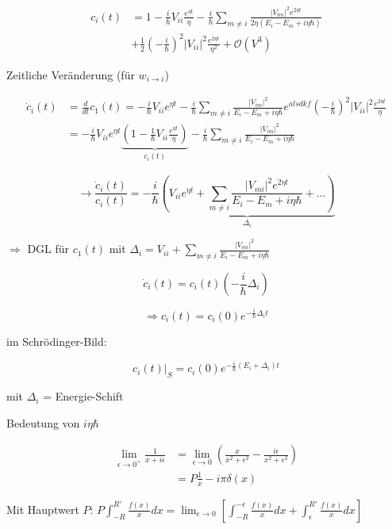 \begin{align}
  c_i(t) &= 1-\frac{i}{\hbar} V_{ii}\frac{e^{\eta t}}{\eta} - \frac{i}{\hbar}\sum_{m\neq i}\frac{|V_{im}|^2e^{2\eta t}}{2\eta(E_i-E_m+i\eta\hbar)}\\
  &+\frac{1}{2}\left(-\frac{i}{\hbar}\right)^2|V_{ii}|^2 \frac{e^{2\eta t}}{\eta^2}+\mathcal O(V^3)
\end{align}



Zeitliche Veränderung (für \(w_{i\rightarrow i}\))

\begin{align}
  \dot c_i(t) &= \frac{d}{dt} c_1(t) = -\frac{i}{\hbar}V_{ii} e^{\eta t}-\frac{i}{\hbar}\sum_{m\neq i}\frac{|V_{im}|^2}{E_i-E_m+i\eta\hbar}e^{alsdkf}\left(-\frac{i}{\hbar}\right)^2|V_{ii}|^2\frac{e^{2\eta t}}{\eta}\\
  &= -\frac{i}{\hbar}V_{ii}e^{\eta t}\underbrace{\left(1-\frac{1}{\hbar}V_{ii}\frac{e^{\eta t}}{\eta} \right)}_{c_i(t)}-\frac{i}{\hbar} \sum_{m\neq i}\frac{|V_{im}|^2}{E_i-E_m+i\eta\hbar}
\end{align}


\[\rightarrow \frac{\dot c_i(t)}{c_i(t)} = -\frac{i}{\hbar}\underbrace{(V_{ii}e^{\eta t}+\sum_{m\neq i}\frac{|V_{mi}|^2e^{2\eta t}}{E_i-E_m+i\eta \hbar}+...)}_{\Delta_i}\]

\(\Rightarrow \) DGL für \(c_1(t)\) mit \(\Delta_i = V_{ii}+\sum_{m\neq i}\frac{|V_{mi}|^2}{E_i-E_m+i\eta \hbar}\)

\[ \dot c_i(t) = c_i(t)(-\frac{i}{\hbar}\Delta_i) \]

\[\boxed{\Rightarrow c_i(t) = c_i(0)e^{-\frac{i}{\hbar}\Delta_i t}}\]

im Schrödinger-Bild:

\[\left.c_i(t)\right|_S=c_i(0)e^{-\frac{i}{\hbar}(E_i+\Delta_i)t}\]

mit \(\Delta_i\) = Energie-Schift

Bedeutung von \(i\eta\hbar\)

\begin{align}
\lim_{\epsilon \to 0^+}\frac{1}{x+i\epsilon} &=\lim_{\epsilon \to 0}\left( \frac{x}{x^2+\epsilon^2}-\frac{i\epsilon}{x^2+\epsilon^2}\right)\\
&= P\frac{1}{x}-i\pi \delta(x)
\end{align}

Mit Hauptwert \(P\):  \(P\int_{-R}^{R'}\frac{f(x)}{x}dx= \lim_{\epsilon \to 0}[\int_{-R}^{-\epsilon}\frac{f(x)}{x}dx +\int_\epsilon^{R'}\frac{f(x)}{x}dx] \)

